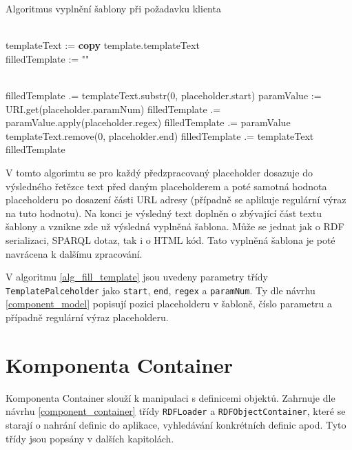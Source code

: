 \documentclass[thesis=B,czech]{FITthesis}[2012/06/26]
\begin{document}
 \begin{algorithm}
\caption{Algoritmus vyplnění šablony při požadavku klienta}
\label{alg_fill_template}
\begin{algorithmic}[1]
\\
templateText := \textbf{copy} template.templateText \\
filledTemplate := ""

 \\
\State filledTemplate .= templateText.substr(0, placeholder.start)
\State paramValue := URI.get(placeholder.paramNum)
  \State filledTemplate .= paramValue.apply(placeholder.regex)
  \Else 
  \State filledTemplate .=  paramValue
\EndIf \\
\State templateText.remove(0, placeholder.end) 
\EndFor
\State filledTemplate .=  templateText \\
\State \Return filledTemplate
\EndProcedure
\end{algorithmic}
\end{algorithm}
  
  V tomto algorimtu se pro každý předzpracovaný placeholder dosazuje do výsledného řetězce text před daným placeholderem a poté samotná hodnota placeholderu po dosazení
  části URL adresy (případně se aplikuje regulární výraz na tuto hodnotu). Na konci je výsledný text doplněn o zbývající část textu šablony a vznikne
  zde už výsledná vyplněná šablona. Může se jednat jak o RDF serializaci, SPARQL dotaz, tak i o HTML kód. Tato vyplněná šablona je poté navrácena k dalšímu zpracování.
  
  V algoritmu \ref{alg_fill_template} jsou uvedeny parametry třídy \texttt{TemplatePalceholder} jako \texttt{start}, \texttt{end}, \texttt{regex} a \texttt{paramNum}.
  Ty dle návrhu \ref{component_model} popisují pozici placeholderu v šabloně, číslo parametru a případně regulární výraz placeholderu.
  
  \section{Komponenta Container}\label{impl_container}
  Komponenta Container slouží k manipulaci s definicemi objektů. Zahrnuje dle návrhu \ref{component_container} třídy \texttt{RDFLoader} a \texttt{RDFObjectContainer},
  které se starají o nahrání definic do aplikace, vyhledávání konkrétních definic apod.
  Tyto třídy jsou popsány v dalších kapitolách.
  
\end{document}
